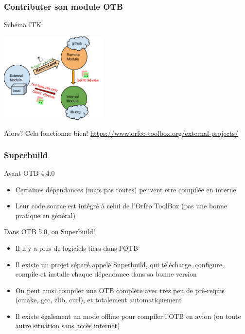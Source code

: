 \documentclass[8pt]{beamer}
\begin{document}
\begin{frame}
\frametitle{Contributer son module OTB}
\begin{block}{Schéma ITK}
\begin{center}
 \includegraphics[width=0.4\textwidth]{images/itk-remote-module.png}
\end{center}

\end{block}
\begin{block}{Alors?}
Cela fonctionne bien! \url{https://www.orfeo-toolbox.org/external-projects/}
\end{block}
\end{frame}


\begin{frame}
\frametitle{Superbuild}
\begin{block}{Avant OTB 4.4.0}
\begin{itemize}
\item Certaines dépendances (mais pas toutes) peuvent etre compilée en interne
\item Leur code source est intégré à celui de l'Orfeo ToolBox (pas une bonne pratique en général)
\end{itemize}
\end{block}

\begin{block}{Dans OTB 5.0, on Superbuild!}
\begin{itemize}
\item Il n'y a plus de logiciels tiers dans l'OTB
\item Il existe un projet séparé appelé Superbuild, qui télécharge, configure, compile et installe chaque dépendance dans sa bonne version
\item On peut ainsi compiler une OTB complète avec très peu de pré-requis (cmake, gcc, zlib, curl), et totalement automatiquement
\item Il existe également un mode offline pour compiler l'OTB en avion (ou toute autre situation sans accès internet)
\end{itemize}
\end{block}
\end{frame}
\end{document}
